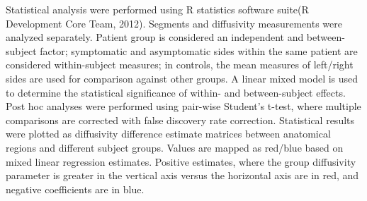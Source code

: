 Statistical analysis were performed using R statistics software suite(R Development Core Team, 2012). Segments and diffusivity measurements were analyzed separately. Patient group is considered an independent and between-subject factor; symptomatic and asymptomatic sides within the same patient are considered within-subject measures; in controls, the mean measures of left/right sides are used for comparison against other groups. A linear mixed model\cite{Pinheiro2011} is used to determine the statistical significance of within- and between-subject effects. Post hoc analyses were performed using pair-wise Student’s t-test, where multiple comparisons are corrected with false discovery rate correction\cite{Hothorn2008}. Statistical results were plotted\cite{Hunter2007} as diffusivity difference estimate matrices between anatomical regions and different subject groups. Values are mapped as red/blue based on mixed linear regression estimates. Positive estimates, where the group diffusivity parameter is greater in the vertical axis versus the horizontal axis are in red, and negative coefficients are in blue. 


